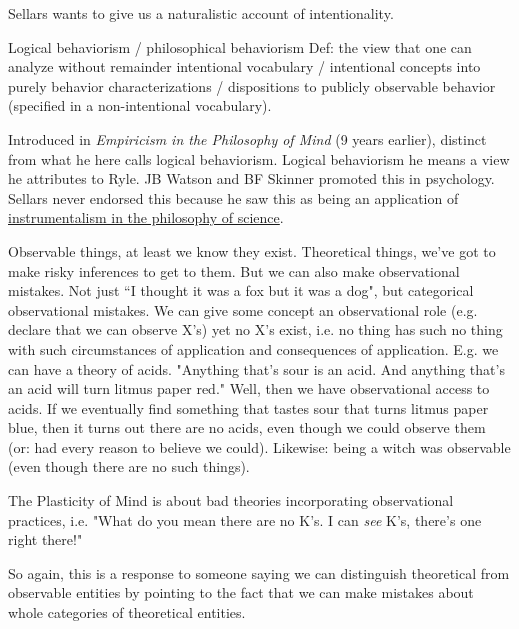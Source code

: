 Sellars wants to give us a naturalistic account of intentionality.

Logical behaviorism / philosophical behaviorism
Def: the view that one can analyze without remainder intentional vocabulary / intentional concepts into purely behavior characterizations / dispositions to publicly observable behavior (specified in a non-intentional vocabulary).

Introduced in \emph{Empiricism in the Philosophy of Mind} (9 years earlier), distinct from what he here calls logical behaviorism. Logical behaviorism he means a view he attributes to Ryle. JB Watson and BF Skinner promoted this in psychology. Sellars never endorsed this because he saw this as being an application of \href{doc/phil/People/Brandom/On Sellars/2009/Lecture03/Instrumentalism}{instrumentalism in the philosophy of science}.

Observable things, at least we know they exist. Theoretical things, we've got to make risky inferences to get to them. But we can also make observational mistakes. Not just ``I thought it was a fox but it was a dog", but categorical observational mistakes. We can give some concept an observational role (e.g. declare that we can observe X's) yet no X's exist, i.e. no thing has such no thing with such circumstances of application and consequences of application. E.g. we can have a theory of acids. "Anything that's sour is an acid. And anything that's an acid will turn litmus paper red." Well, then we have observational access to acids. If we eventually find something that tastes sour that turns litmus paper blue, then it turns out there are no acids, even though we could observe them (or: had every reason to believe we could). Likewise: being a witch was observable (even though there are no such things).

The Plasticity of Mind is about bad theories incorporating observational practices, i.e. "What do you mean there are no K's. I can \emph{see} K's, there's one right there!"

So again, this is a response to someone saying we can distinguish theoretical from observable entities by pointing to the fact that we can make mistakes about whole categories of theoretical entities.


